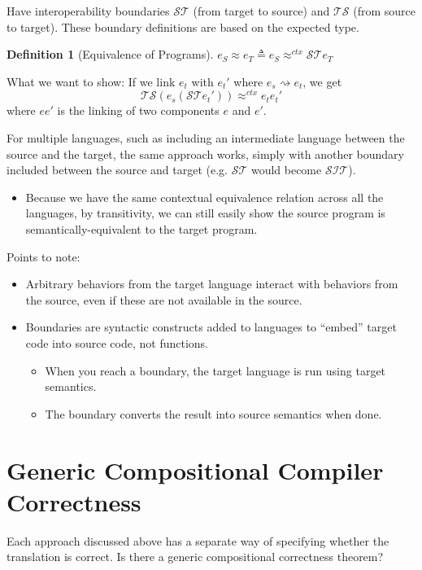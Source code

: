 \documentclass[11pt]{article}
\newcommand{\compile}{\rightsquigarrow}
\newtheorem{defn}{Definition}[section]
\begin{document}
Have interoperability boundaries $\mathcal{ST}$ (from target to
source) and $\mathcal{TS}$ (from source to target).  These boundary
definitions are based on the expected type.

\begin{defn}[Equivalence of Programs]
$e_S \approx e_T  \triangleq  e_S \approx^{ctx} \mathcal{ST}e_T$
\end{defn}

What we want to show: If we link $e_t$ with $e_t'$ where $e_s \compile
e_t$, we get
\[\mathcal{TS}(e_s(\mathcal{ST}e_t')) \approx^{ctx} e_t e_t'\]
where $e e'$ is the linking of two components $e$ and $e'$.

For multiple languages, such as including an intermediate language
between the source and the target, the same approach works, simply
with another boundary included between the source and target
(e.g. $\mathcal{ST}$ would become $\mathcal{SIT}$).
\begin{itemize}
\item Because we have the same contextual equivalence relation across
  all the languages, by transitivity, we can still easily show the
  source program is semantically-equivalent to the target program.
\end{itemize}

Points to note:
\begin{itemize}
\item Arbitrary behaviors from the target language interact with
  behaviors from the source, even if these are not available in the
  source.
\item Boundaries are syntactic constructs added to languages to
  ``embed'' target code into source code, not functions.
  \begin{itemize}
  \item When you reach a boundary, the target language is run using
    target semantics.
  \item The boundary converts the result into source semantics when
    done.
  \end{itemize}
\end{itemize}



\section{Generic Compositional Compiler Correctness}
Each approach discussed above has a separate way of specifying whether
the translation is correct.  Is there a generic compositional
correctness theorem?
\end{document}
